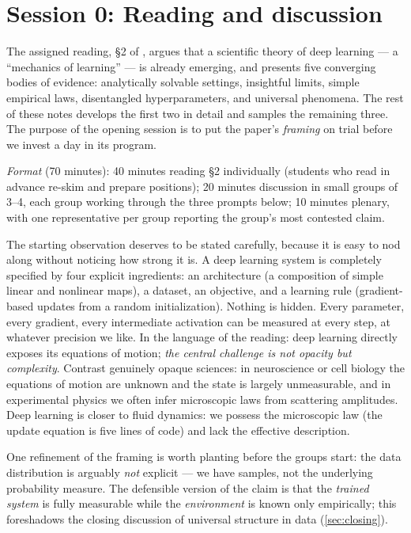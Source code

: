 \documentclass[11pt]{article}
\begin{document}
\section{Session 0: Reading and discussion}
\label{sec:reading}

The assigned reading, \S2 of \cite{simon2026scientific}, argues that a
scientific theory of deep learning --- a ``mechanics of learning'' --- is
already emerging, and presents five converging bodies of evidence:
analytically solvable settings, insightful limits, simple empirical laws,
disentangled hyperparameters, and universal phenomena. The rest of these
notes develops the first two in detail and samples the remaining three. The
purpose of the opening session is to put the paper's \emph{framing} on
trial before we invest a day in its program.

\emph{Format} (70 minutes): 40 minutes reading \S2 individually (students
who read in advance re-skim and prepare positions); 20 minutes discussion
in small groups of 3--4, each group working through the three prompts
below; 10 minutes plenary, with one representative per group reporting the
group's most contested claim.

The starting observation deserves to be stated carefully, because it is easy
to nod along without noticing how strong it is. A deep learning system is
completely specified by four explicit ingredients: an architecture (a
composition of simple linear and nonlinear maps), a dataset, an objective,
and a learning rule (gradient-based updates from a random initialization).
Nothing is hidden. Every parameter, every gradient, every intermediate
activation can be measured at every step, at whatever precision we like. In
the language of the reading: deep learning directly exposes its equations of
motion; \emph{the central challenge is not opacity but complexity}. Contrast
genuinely opaque sciences: in neuroscience or cell biology the equations of
motion are unknown and the state is largely unmeasurable, and in
experimental physics we often infer microscopic laws from scattering
amplitudes. Deep learning is closer to fluid dynamics: we possess the
microscopic law (the update equation is five lines of code) and lack the
effective description.

One refinement of the framing is worth planting before the groups start:
the data distribution is arguably \emph{not} explicit --- we have samples,
not the underlying probability measure. The defensible version of the claim
is that the \emph{trained system} is fully measurable while the
\emph{environment} is known only empirically; this foreshadows the closing
discussion of universal structure in data (\cref{sec:closing}).
\end{document}
